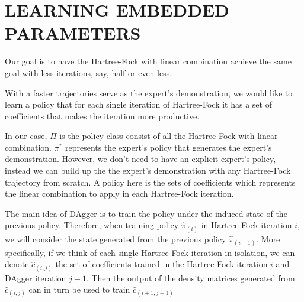 \documentclass[twoside]{article}
\begin{document}

\section{LEARNING EMBEDDED PARAMETERS}

Our goal is to have the Hartree-Fock with linear combination achieve the same goal with less iterations, say, half or even less.  



% 

With a faster trajectories serve as the expert's demonstration, we would like to learn a policy that for each single iteration of Hartree-Fock it has a set of coefficients that makes the iteration more productive.   

In our case, $\Pi$ is the policy class consist of all the Hartree-Fock with linear combination. $\pi^*$ represents the expert's policy that generates the expert's demonstration. However, we don't need to have an explicit expert's policy, instead we can build up the the expert's demonstration with any Hartree-Fock trajectory from scratch. A policy here is the sets of coefficients which represents the linear combination to apply in each Hartree-Fock iteration. 




The main idea of DAgger is to train the policy under the induced state of the previous policy. Therefore, when training policy $\hat{\pi}_{(i)}$ in Hartree-Fock iteration $i$,
we will consider the state generated from the previous policy $\hat{\pi}_{(i-1)}$. More specifically, if we think of each single Hartree-Fock iteration in isolation, we can denote $\hat{c}_{(i,j)}$ the set of coefficients trained in the Hartree-Fock iteration $i$ and DAgger iteration $j-1$. Then the output of the density matrices generated from $\hat{c}_{(i,j)}$ can in turn be used to train $\hat{c}_{(i+1,j+1)}$
\end{document}
